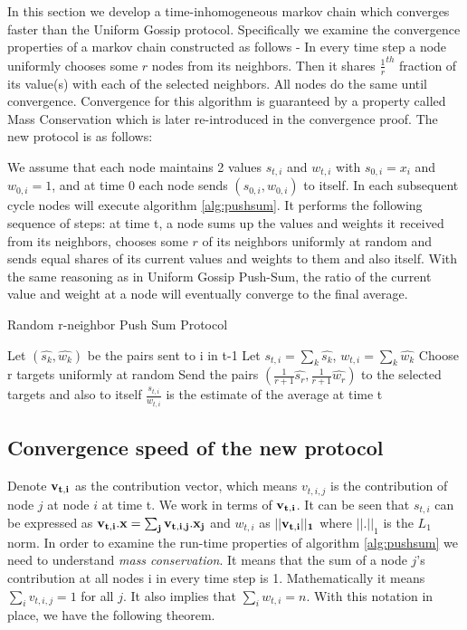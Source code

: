 \documentclass[runningheads,a4paper]{llncs}
\begin{document}
In this section we develop a time-inhomogeneous markov chain which converges faster than the Uniform Gossip protocol. Specifically we examine the convergence properties of a markov chain constructed as follows - In every time step a node uniformly chooses some $r$ nodes from its neighbors. Then it shares $\frac{1}{r}^{th}$ fraction of its value(s) with each of the selected neighbors. All nodes do the same until convergence. Convergence for this algorithm is guaranteed by a property called Mass Conservation \cite{Kempe03gossip-basedcomputation} which is later re-introduced in the convergence proof. The new protocol is as follows:

We assume that each node maintains 2 values $s_{t,i}$  and $w_{t,i}$ with $s_{0,i}=x_i$ and $w_{0,i}=1$, and at time 0 each node sends $(s_{0,i},w_{0,i})$ to itself. In each subsequent cycle nodes will execute algorithm \ref{alg:pushsum}. It performs the following sequence of steps: at time t, a node sums up the values and weights it received from its neighbors, chooses some $r$ of its neighbors uniformly at random and sends equal shares of its current values and weights to them and also itself. With the same reasoning as in Uniform Gossip Push-Sum, the ratio of the current value and weight at a node will eventually converge to the final average.

\begin{algorithm}[tb]
   \caption{Random r-neighbor Push Sum Protocol}
   \label{alg:pushsum}
\begin{algorithmic}[1]
	\STATE Let ${(\hat{s_k},\hat{w_k})}$ be the pairs sent to i in t-1
	\STATE Let $s_{t,i} = \sum_k \hat{s_k}$, $w_{t,i} = \sum_k \hat{w_k}$
	\STATE Choose r targets uniformly at random
	\STATE Send the pairs $(\frac{1}{r+1}\hat{s_r},\frac{1}{r+1}\hat{w_r})$ to the selected targets and also to itself
	\STATE $\frac{s_{t,i}}{w_{t,i}}$ is the estimate of the average at time t
\end{algorithmic}
\end{algorithm}

\subsection{Convergence speed of the new protocol}\label{convergence}
Denote $\bf v_{t,i}$ as the contribution vector, which means $v_{t,i,j}$ is the contribution of node $j$ at node $i$ at time t. We work in terms of $\bf v_{t,i}$. It can be seen that $s_{t,i}$ can be expressed as $\bf v_{t,i}.x=\sum_j v_{t,i,j}.x_j$ and $w_{t,i}$ as $||\bf v_{t,i} ||_1$ where $||.||_1$ is the $L_1$ norm. In order to examine the run-time properties of algorithm \ref{alg:pushsum} we need to understand \emph{mass conservation}. It means that the sum of a node $j$'s contribution at all nodes i in every time step is 1. Mathematically it means $\sum_i v_{t,i,j}=1$ for all $j$. It also implies that $\sum_i w_{t,i}=n$. With this notation in place, we have the following theorem.
\end{document}
